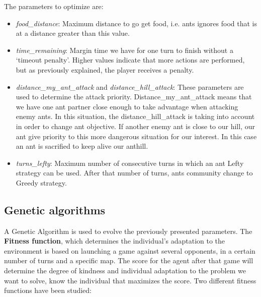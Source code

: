 \documentclass[runningheads]{llncs}
\begin{document}
 
The parameters to optimize are:
\begin{itemize}
  \item {\em food\_distance}: Maximum distance to go get food, i.e. ants ignores food that is at a distance greater than this value.
  \item {\em time\_remaining}: Margin time we have for one turn to finish without a `timeout penalty'. Higher values indicate that more actions are performed, but as previously explained, the player receives a penalty.
  \item {\em distance\_my\_ant\_attack} and {\em distance\_hill\_attack}: These parameters are used to determine the attack priority.  Distance\_my\_ant\_attack means that we have one ant partner close enough to take advantage when attacking enemy ants. In this situation, the distance\_hill\_attack is taking into account in order to change ant objective. If another enemy ant is close to our hill, our ant give priority to this more dangerous situation for our interest. In this case an ant is sacrified to keep alive our anthill.
  \item {\em turns\_lefty}: Maximum number of consecutive turns in which an ant Lefty strategy can be used. After that number of turns, ants community change to Greedy strategy.

\end{itemize}

\subsection{Genetic algorithms}
A Genetic Algorithm is used to evolve the previously presented parameters. The {\bf Fitness function}, which determines the individual's adaptation to the environment is based on launching a game against several opponents, in a certain number of turns and a specific map.
The score for the agent after that game will determine the degree of kindness and individual adaptation to the problem we want to solve, know the individual that maximizes the score. Two different fitness functions have been studied:
\end{document}
